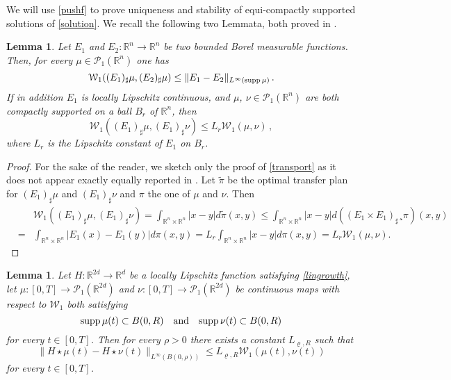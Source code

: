 \documentclass[11pt]{article}
\theoremstyle{plain}
\newtheorem{lemma}[theorem]{Lemma}
\theoremstyle{definition}
\theoremstyle{remark}
\numberwithin{equation}{section}
\newcommand{\R}{{\mathbb R}}
\newcommand{\Rn}{{\R}^n}
\newcommand{\PP}{{\mathcal P}_1}
\newcommand{\WW}{{\mathcal W}_1}
\begin{document}
We will use \eqref{pushf} to prove uniqueness and stability of equi-compactly supported solutions of \eqref{solution}. We recall the following two Lemmata, both proved in \cite{CanCarRos10}.

\begin{lemma}\label{primstim}
Let $E_1$ and $E_2 \colon \Rn \to \Rn$ be two bounded Borel measurable functions. Then, for every $\mu \in \PP(\Rn)$ one has
\begin{equation*}
\WW((E_1)_\sharp \mu, (E_2)_\sharp \mu) \le \|E_1-E_2\|_{L^\infty({\rm supp}\,\mu)}\,.
\end{equation*}
If in addition $E_1$ is locally Lipschitz continuous, and $\mu$, $\nu \in \PP(\Rn)$ are both compactly supported on a ball $B_r$ of $\Rn$, then
\begin{equation}\label{transport}
\WW((E_1)_\sharp \mu, (E_1)_\sharp \nu) \le L_r \WW(\mu, \nu)\,,
\end{equation}
where $L_r$ is the Lipschitz constant of $E_1$ on $B_r$.
\end{lemma}

\begin{proof}
For the sake of the reader, we sketch only the proof of \eqref{transport} as it does not appear exactly equally reported in \cite[Lemmata 3.11 and 3.15]{CanCarRos10}. Let $\tilde \pi$ be the optimal transfer plan for $(E_1)_\sharp \mu$ and 
$(E_1)_\sharp \nu$ and $\pi$ the one of $\mu$ and $\nu$. Then
\begin{eqnarray*}
&& \mathcal W_1((E_1)_\sharp \mu, (E_1)_\sharp \nu) = \int_{\mathbb R^n \times \mathbb R^n} |x-y| d\tilde \pi(x,y) \leq \int_{\mathbb R^n \times \mathbb R^n} |x-y| d((E_1 \times E_1)_\sharp ¸\pi)(x,y) \\
&=& \int_{\mathbb R^n \times \mathbb R^n} |E_1(x)-E_1(y)| d \pi(x,y) = L_r \int_{\mathbb R^n \times \mathbb R^n} |x-y| d \pi(x,y) =L_r \mathcal W_1(\mu,\nu).
\end{eqnarray*}
\end{proof}

\begin{lemma}\label{secstim}
Let $H\colon \R^{2d} \to \R^{d}$ be a locally Lipschitz function satisfying \eqref{lingrowth}, let $\mu\colon[0,T]\to \PP(\R^{2d})$ and $\nu\colon[0,T]\to \PP(\R^{2d})$ be continuous maps with respect to $\WW$ both satisfying 
\begin{equation*}
{\rm supp }\,\mu(t)\subset B(0,R)\quad\hbox{and}\quad {\rm supp }\,\nu(t)\subset B(0,R)
\end{equation*}
for every $t \in [0, T]$. Then for every $\rho >0$ there exists a constant $L_{\varrho, R}$ such that
$$
\|H\star \mu(t)-H\star \nu(t)\|_{L^\infty(B(0,\rho))}\le L_{\varrho, R}\WW(\mu(t), \nu(t))
$$
for every $t \in [0, T]$.
\end{lemma}
\end{document}
